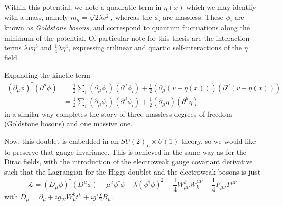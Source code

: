 Within this potential, we note a quadratic term in $\eta(x)$ which we may identify with a mass, namely
$m_{\eta} = \sqrt{2\lambda v^2}$, whereas the $\phi_{i}$ are massless. These $\phi_{i}$ are known as 
\emph{Goldstone bosons}, and correspond to quantum fluctuations along the minimum of the potential.
Of particular note for this thesis are the interaction terms $\lambda v \eta^3$ and $\frac{1}{4}\lambda\eta^4$,
expressing trilinear and quartic self-interactions of the $\eta$ field.

Expanding the kinetic term
\begin{align}
(\partial_{\mu}\phi)^{\dagger}(\partial^{\mu}\phi) &= \frac{1}{2}\sum\limits_{i}(\partial_{\mu}\phi_i)(\partial^{\mu}\phi_i) + \frac{1}{2}(\partial_{\mu}(v+\eta(x)))(\partial^{\mu}(v+\eta(x)))\\
&= \frac{1}{2}\sum\limits_{i}(\partial_{\mu}\phi_i)(\partial^{\mu}\phi_i) + \frac{1}{2}(\partial_{\mu}\eta)(\partial^{\mu}\eta)
\end{align}
in a similar way completes the story of three massless degrees of freedom (Goldstone bosons) and one massive one.


Now, this doublet is embedded in an $SU(2)_{L} \times U(1)$ theory, so we would like to preserve that gauge 
invariance. This is achieved in the same way as for the Dirac fields, with the introduction of the electroweak 
gauge covariant derivative such that the Lagrangian for the Higgs doublet and the electroweak bosons is just
\begin{equation}
\mathcal{L} = (D_{\mu}\phi)^{\dagger}(D^{\mu}\phi) -\mu^2\phi^{\dagger}\phi - \lambda(\phi^{\dagger}\phi)^2 -\frac{1}{4} W_{\mu\nu}^{k}W^{\mu\nu}_{k} - \frac{1}{4}F_{\mu\nu}F^{\mu\nu}
\end{equation}
with $D_{\mu} = \partial_{\mu} + ig_{W}W_{\mu}^{k}t^{k} + ig'\frac{Y}{2}B_{\mu}$.


